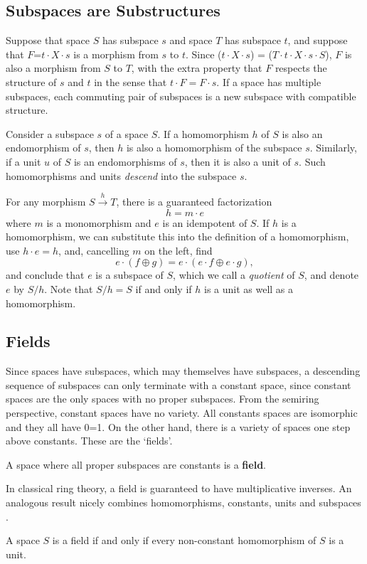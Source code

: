 \documentclass[11pt]{article}
\begin{document}
\subsection{Subspaces are Substructures} 

Suppose that space $S$ has subspace $s$ and space $T$ has subspace $t$, and suppose that $F$=$t\cdot X\cdot s$ is a morphism from $s$ to $t$.   
Since ($t\cdot X\cdot s$) = ($T\cdot t \cdot X\cdot s\cdot S$), 
$F$ is also a morphism from $S$ to $T$, with the extra property that $F$ respects the structure of $s$ and $t$ in the sense that $t\cdot F=F\cdot s$.  
If a space has multiple subspaces, each commuting pair of subspaces is a new subspace with compatible structure.  

     Consider a subspace $s$ of a space $S$.  If a homomorphism $h$ of $S$ is also an endomorphism of $s$, then $h$ is also a 
homomorphism of the subspace $s$.  Similarly, if a unit $u$ of $S$ is an endomorphisms of $s$, then it is also a unit of $s$.  Such 
homomorphisms and units {\it descend} into the subspace $s$.  

       For any morphism $S{\overset h \longrightarrow}T$, there is a guaranteed factorization  
\begin{equation}
h = m \cdot e
\end{equation}
where $m$ is a monomorphism and $e$ is an idempotent of $S$.  If $h$ is a homomorphism, we can substitute this into the 
definition of a homomorphism, use $h\cdot e=h$, and, cancelling $m$ on the left, find 
\begin{equation}
e\cdot (f\oplus g) = e\cdot (e\cdot f \oplus e\cdot g),
\end{equation}
and conclude that $e$ is a subspace of $S$, which we call a {\it quotient} of $S$, and denote $e$ by $S/h$.  Note that $S/h=S$ if and only if $h$ is a unit as well as a homomorphism. 

\subsection{Fields}

Since spaces have subspaces, which may themselves have subspaces, a descending sequence of subspaces can only terminate 
with a constant space, since constant spaces are the only spaces with no proper subspaces.  From the semiring perspective, 
constant spaces have no variety.  All constants spaces are isomorphic and they all have 0=1.  On the other hand, there is a variety of 
spaces one step above constants.  These are the `fields'.  
\begin{definition}
A space where all proper subspaces are constants is a {\bf field}.
\end{definition}
\noindent In classical ring theory, a field is guaranteed to have 
multiplicative inverses.  An analogous result nicely combines homomorphisms, constants, units and subspaces \cite{Ring}.  
\begin{theorem}
A space $S$ is a field if and only if every non-constant homomorphism of $S$ is a unit. 
\end{theorem}
\end{document}
